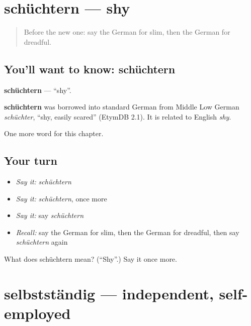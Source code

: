 \section[schüchtern]{schüchtern — shy}

\label{lesson:GE-C221-schuechtern}



\begin{quote}
Before the new one: say the German for slim, then the German for dreadful.
\end{quote}

\subsection*{You'll want to know: schüchtern}
\textbf{schüchtern} — \textquotedblleft{}shy\textquotedblright{}.

\begin{cousinweb}
\textbf{schüchtern} was borrowed into standard German from Middle Low German \emph{schüchter}, \textquotedblleft{}shy, easily scared\textquotedblright{} (EtymDB 2.1). It is related to English \emph{shy}.
\end{cousinweb}

\begin{grammarlens}[title={What you've built}]
One more word for this chapter.
\end{grammarlens}

\subsection*{Your turn}
\begin{itemize}
\raggedright
  \item \emph{Say it:} \emph{schüchtern}
  \item \emph{Say it:} \emph{schüchtern}, once more
  \item \emph{Say it:} say \emph{schüchtern}
  \item \emph{Recall:} say the German for slim, then the German for dreadful, then say \emph{schüchtern} again
\end{itemize}

\begin{tcolorbox}[breakable,colback=teal!4,colframe=teal!35!black,title={Before you move on}]
What does schüchtern mean? (\textquotedblleft{}Shy\textquotedblright{}.) Say it once more.
\end{tcolorbox}
\section[selbstständig]{selbstständig — independent, self-employed}

